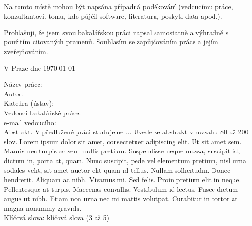 \normalsize %
\setcounter{page}{2} %
\ \vspace{10mm} 

\noindent Na tomto místě mohou být napsána případná poděkování (vedoucímu práce, konzultantovi, tomu, kdo půjčil software, literaturu, poskytl data apod.). %

\vspace{\fill} %
\noindent Prohlašuji, že jsem svou bakalářskou práci napsal samostatně a výhradně s použitím citovaných pramenů. Souhlasím se zapůjčováním práce a jejím zveřejňováním.

\bigskip
\noindent V Praze dne \today\hspace{\fill}\bcAuthor\\ %

\newpage
\tableofcontents %

\newpage %

\noindent
Název práce: \bcTitle\\
Autor: \bcAuthor\\
Katedra (ústav): \bcKSVI\\
Vedoucí bakalářské práce: \bcTeacher\\
e-mail vedoucího: \bcTeacherMail\\

\noindent Abstrakt:  V předložené práci studujeme ... Uvede se abstrakt v rozsahu 80 až 200 slov. Lorem ipsum dolor sit amet, consectetuer adipiscing elit. Ut sit amet sem. Mauris nec turpis ac sem mollis pretium. Suspendisse neque massa, suscipit id, dictum in, porta at, quam. Nunc suscipit, pede vel elementum pretium, nisl urna sodales velit, sit amet auctor elit quam id tellus. Nullam sollicitudin. Donec hendrerit. Aliquam ac nibh. Vivamus mi. Sed felis. Proin pretium elit in neque. Pellentesque at turpis. Maecenas convallis. Vestibulum id lectus. Fusce dictum augue ut nibh. Etiam non urna nec mi mattis volutpat. Curabitur in tortor at magna nonummy gravida.\\

\noindent Klíčová slova: klíčová slova (3 až 5)

\vspace{10mm}

